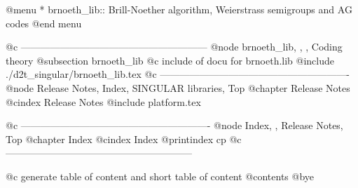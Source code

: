 @menu
* brnoeth_lib:: Brill-Noether algorithm, Weierstrass semigroups and AG codes
@end menu

@c ---------------------------------------------------------
@node brnoeth_lib, , , Coding theory
@subsection brnoeth_lib
@c include of docu for brnoeth.lib
@include ./d2t_singular/brnoeth_lib.tex
@c ----------------------------------------------------------
@node Release Notes, Index, SINGULAR libraries, Top
@chapter Release Notes
@cindex Release Notes
@include platform.tex

@c ----------------------------------------------------------
@node Index, , Release Notes, Top
@chapter Index
@cindex Index
@printindex cp
@c ---------------------------------------------------------

@c generate table of content and short table of content
@contents
@bye
